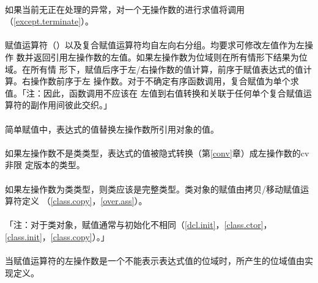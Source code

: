 \paragraph{}
如果当前无正在处理的异常，对一个无操作数的进行求值将调用
（\ref{except.terminate}）。

\paragraph{}
赋值运算符（\tm{=}）以及复合赋值运算符均自左向右分组。均要求可修改左值作为左操作
数并返回引用左操作数的左值。如果左操作数为位域则在所有情形下结果为位域。在所有情
形下，赋值后序于左/右操作数的值计算，前序于赋值表达式的值计算。右操作数前序于左
操作数。对于不确定有序函数调用，复合赋值为单个求值。「注：因此，函数调用不应该在
左值到右值转换和关联于任何单个复合赋值运算符的副作用间彼此交织。」

  \synprd[]{\tm{= *= /= \%= += -= \tg{}\tg= \tl{}\tl= \&= \^{}= |=}}

\paragraph{}
简单赋值中，表达式的值替换左操作数所引用对象的值。

\paragraph{}
如果左操作数不是类类型，表达式的值被隐式转换（第\ref{conv}章）成左操作数的cv非限
定版本的类型。

\paragraph{}
如果左操作数为类类型，则类应该是完整类型。类对象的赋值由拷贝/移动赋值运算符定义
（\ref{class.copy}，\ref{over.ass}）。

\paragraph{}
「注：对于类对象，赋值通常与初始化不相同（\ref{dcl.init}，\ref{class.ctor}，
\ref{class.init}，\ref{class.copy}）。」

\paragraph{}
当赋值运算符的左操作数是一个不能表示表达式值的位域时，所产生的位域值由实现定义。

